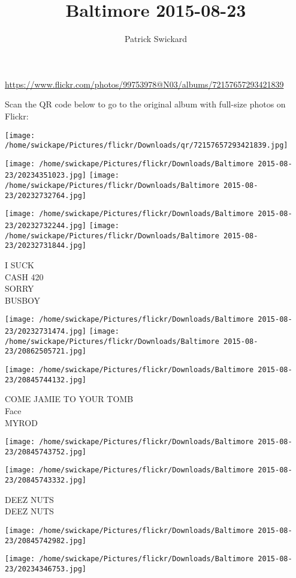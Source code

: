 \documentclass[10pt,letterpaper]{article}
\title{Baltimore 2015-08-23}
\author{Patrick Swickard}
\date{}
\begin{document}
\maketitle

\url{https://www.flickr.com/photos/99753978@N03/albums/72157657293421839}

Scan the QR code below to go to the original album with full-size photos on Flickr:

\texttt{[image: /home/swickape/Pictures/flickr/Downloads/qr/72157657293421839.jpg]}
\pagebreak

\texttt{[image: /home/swickape/Pictures/flickr/Downloads/Baltimore 2015-08-23/20234351023.jpg]}
\texttt{[image: /home/swickape/Pictures/flickr/Downloads/Baltimore 2015-08-23/20232732764.jpg]}

\texttt{[image: /home/swickape/Pictures/flickr/Downloads/Baltimore 2015-08-23/20232732244.jpg]}
\texttt{[image: /home/swickape/Pictures/flickr/Downloads/Baltimore 2015-08-23/20232731844.jpg]}

I SUCK\\
CASH 420\\
SORRY\\
BUSBOY
\pagebreak

\texttt{[image: /home/swickape/Pictures/flickr/Downloads/Baltimore 2015-08-23/20232731474.jpg]}
\texttt{[image: /home/swickape/Pictures/flickr/Downloads/Baltimore 2015-08-23/20862505721.jpg]}

\texttt{[image: /home/swickape/Pictures/flickr/Downloads/Baltimore 2015-08-23/20845744132.jpg]}

COME JAMIE TO YOUR TOMB\\
Face\\
MYROD
\pagebreak

\texttt{[image: /home/swickape/Pictures/flickr/Downloads/Baltimore 2015-08-23/20845743752.jpg]}

\vspace{0.25in}
\texttt{[image: /home/swickape/Pictures/flickr/Downloads/Baltimore 2015-08-23/20845743332.jpg]}

DEEZ NUTS\\
DEEZ NUTS
\pagebreak

\texttt{[image: /home/swickape/Pictures/flickr/Downloads/Baltimore 2015-08-23/20845742982.jpg]}

\vspace{0.25in}
\texttt{[image: /home/swickape/Pictures/flickr/Downloads/Baltimore 2015-08-23/20234346753.jpg]}
\end{document}
